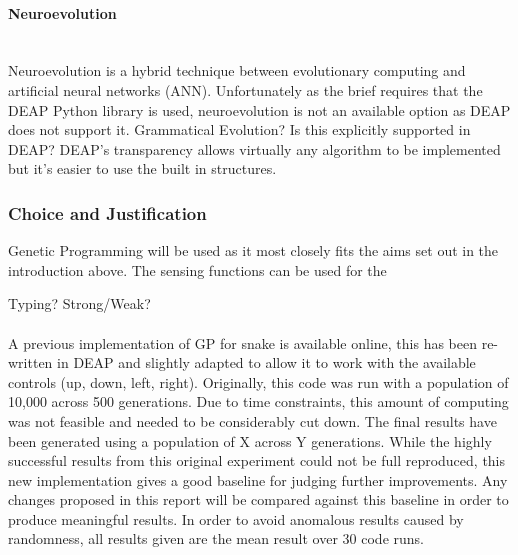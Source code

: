 \documentclass{article}
\newcommand{\myparagraph}[1]{\paragraph{#1}\mbox{}\\}
\begin{document}
\myparagraph{Neuroevolution}
Neuroevolution is a hybrid technique between evolutionary computing and artificial neural networks (ANN).
Unfortunately as the brief requires that the DEAP Python library is used, neuroevolution is not an available option as DEAP does not support it.
Grammatical Evolution? Is this explicitly supported in DEAP?\cite{deap}
DEAP's transparency allows virtually any algorithm to be implemented but it's easier to use the built in structures.



\subsubsection{Choice and Justification}
Genetic Programming will be used as it most closely fits the aims set out in the introduction above. The sensing functions can be used for the 

Typing? Strong/Weak?
\\\\
A previous implementation of GP for snake is available online\cite{snake_blog}, this has been re-written in DEAP and slightly adapted to allow it to work with the available controls (up, down, left, right). Originally, this code was run with a population of 10,000 across 500 generations. Due to time constraints, this amount of computing was not feasible and needed to be considerably cut down. The final results have been generated using a population of X across Y generations. While the highly successful results from this original experiment could not be full reproduced, this new implementation gives a good baseline for judging further improvements. Any changes proposed in this report will be compared against this baseline in order to produce meaningful results. In order to avoid anomalous results caused by randomness, all results given are the mean result over 30 code runs.%
\end{document}
